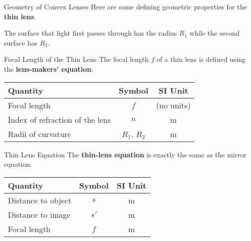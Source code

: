 \documentclass[12pt,compress,aspectratio=169]{beamer}
\begin{document}
\begin{frame}{Geometry of Convex Lenses}
  Here are some defining geometric properties for the \textbf{thin lens}.
  \begin{center}
  \end{center}
  The surface that light first passes through has the radius $R_1$ while the
  second surface has $R_2$.
\end{frame}



\begin{frame}{Focal Length of the Thin Lens}
  The focal length $f$ of a thin lens is defined using the
  \textbf{lens-makers' equation}:

  \begin{center}
    \begin{tabular}{l|c|c}
      \rowcolor{pink}
      \textbf{Quantity} & \textbf{Symbol} & \textbf{SI Unit} \\ \hline
      Focal length                    & $f$ & (no units)\\
      Index of refraction of the lens & $n$ & \si{\metre} \\
      Radii of curvature              & $R_1$, $R_2$ & \si{\metre}
    \end{tabular}
  \end{center}  
\end{frame}



\begin{frame}{Thin Lens Equation}
  The \textbf{thin-lens equation} is exactly the same as the mirror equation:

  \begin{center}
    \begin{tabular}{l|c|c}
      \rowcolor{pink}
      \textbf{Quantity} & \textbf{Symbol} & \textbf{SI Unit} \\ \hline
      Distance to object & $s$  & \si{\metre} \\
      Distance to image  & $s'$ & \si{\metre} \\
      Focal length       & $f$  & \si{\metre}
    \end{tabular}
  \end{center}
\end{frame}
\end{document}
